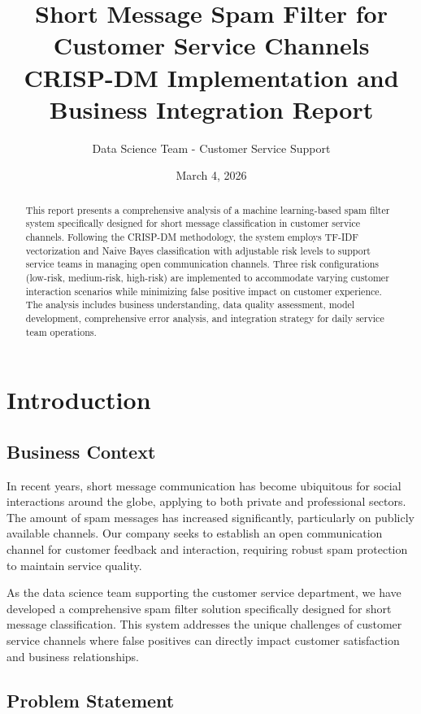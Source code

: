 \documentclass[12pt,a4paper]{article}
\title{\textbf{Short Message Spam Filter for Customer Service Channels}\\ 
       \large CRISP-DM Implementation and Business Integration Report}
\author{Data Science Team - Customer Service Support}
\date{March 4, 2026}
\begin{document}
\maketitle

\begin{abstract}
This report presents a comprehensive analysis of a machine learning-based spam filter system specifically designed for short message classification in customer service channels. Following the CRISP-DM methodology, the system employs TF-IDF vectorization and Naive Bayes classification with adjustable risk levels to support service teams in managing open communication channels. Three risk configurations (low-risk, medium-risk, high-risk) are implemented to accommodate varying customer interaction scenarios while minimizing false positive impact on customer experience. The analysis includes business understanding, data quality assessment, model development, comprehensive error analysis, and integration strategy for daily service team operations.
\end{abstract}

\tableofcontents
\newpage

\section{Introduction}

\subsection{Business Context}

In recent years, short message communication has become ubiquitous for social interactions around the globe, applying to both private and professional sectors. The amount of spam messages has increased significantly, particularly on publicly available channels. Our company seeks to establish an open communication channel for customer feedback and interaction, requiring robust spam protection to maintain service quality.

As the data science team supporting the customer service department, we have developed a comprehensive spam filter solution specifically designed for short message classification. This system addresses the unique challenges of customer service channels where false positives can directly impact customer satisfaction and business relationships.

\subsection{Problem Statement}
\end{document}
